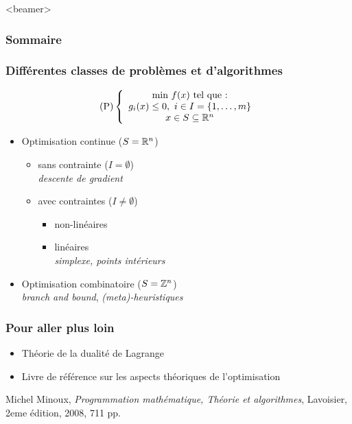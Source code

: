 \documentclass{beamer}
\newcommand{\Z}{{\ensuremath\mathbb{Z}}}
\newcommand{\R}{{\ensuremath\mathbb{R}}}
\begin{document}
\begin{frame}<beamer>
  \frametitle{Sommaire}
  \tableofcontents[currentsection]
\end{frame}

\begin{frame}
  \frametitle{Différentes classes de problèmes et d'algorithmes}

  \[
  \text{(P)} \left\{
  \begin{array}{c}
    \text{min} \ f(x) \ \text{tel que :} \\
    g_i(x) \leq 0, \ i \in I = \{1, \dots, m\} \\
    x \in S \subseteq \R^n
  \end{array}
  \right.
  \]

  \begin{itemize}
  \item Optimisation continue ($S = \R^n$)
    \begin{itemize}
    \item sans contrainte ($I = \emptyset$) \\
      \emph{descente de gradient}
    \item avec contraintes ($I \neq \emptyset$) 
      \begin{itemize}
        \item non-linéaires
        \item linéaires \\
        \emph{simplexe, points intérieurs}
      \end{itemize}
    \end{itemize}
  \item Optimisation combinatoire ($S = \Z^n$)\\
    \emph{branch and bound}, \emph{(meta)-heuristiques} 
  \end{itemize}
  
\end{frame}

\begin{frame}
  \frametitle{Pour aller plus loin}

  \begin{itemize}
  \item Théorie de la dualité de Lagrange
  \end{itemize}


  \begin{itemize}
  \item Livre de référence sur les aspects théoriques de l'optimisation
  \end{itemize}

\begin{thebibliography}{alpha}
Michel Minoux, \emph{Programmation mathématique, Théorie et algorithmes}, Lavoisier, 2eme édition, 2008, 711 pp.
\end{thebibliography}

\end{frame}
\end{document}
